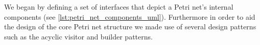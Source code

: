 We began by defining a set of interfaces that depict a Petri net's internal components (see \cref{lst:petri_net_components_uml}).  Furthermore in order to aid the design of the core Petri net structure we made use of several design patterns such as the acyclic visitor and builder patterns.
